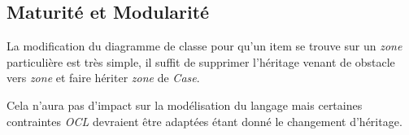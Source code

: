 
\subsection{Maturité et Modularité}
\label{sec:question-22}

La modification du diagramme de classe pour qu'un item se trouve sur un \emph{zone} particulière est très simple, il suffit de supprimer l'héritage venant de obstacle vers \emph{zone} et 
faire hériter \emph{zone} de \emph{Case}.

Cela n'aura pas d'impact sur la modélisation du langage mais certaines contraintes \emph{OCL} devraient être adaptées étant donné le changement d'héritage.